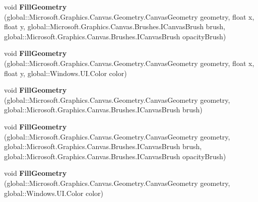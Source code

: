 \begin{DoxyCompactItemize}
\item 
\mbox{\label{class_microsoft_1_1_graphics_1_1_canvas_1_1_canvas_drawing_session_abc70f39b3a78c8e70caa372c554fce31}} 
void {\bfseries Fill\+Geometry} (global\+::\+Microsoft.\+Graphics.\+Canvas.\+Geometry.\+Canvas\+Geometry geometry, float x, float y, global\+::\+Microsoft.\+Graphics.\+Canvas.\+Brushes.\+I\+Canvas\+Brush brush, global\+::\+Microsoft.\+Graphics.\+Canvas.\+Brushes.\+I\+Canvas\+Brush opacity\+Brush)
\item 
\mbox{\label{class_microsoft_1_1_graphics_1_1_canvas_1_1_canvas_drawing_session_a91e2f4442ed0c330f3dd797c3fd4cf52}} 
void {\bfseries Fill\+Geometry} (global\+::\+Microsoft.\+Graphics.\+Canvas.\+Geometry.\+Canvas\+Geometry geometry, float x, float y, global\+::\+Windows.\+U\+I.\+Color color)
\item 
\mbox{\label{class_microsoft_1_1_graphics_1_1_canvas_1_1_canvas_drawing_session_a2974139306e2c32e4199065c8186fe79}} 
void {\bfseries Fill\+Geometry} (global\+::\+Microsoft.\+Graphics.\+Canvas.\+Geometry.\+Canvas\+Geometry geometry, global\+::\+Microsoft.\+Graphics.\+Canvas.\+Brushes.\+I\+Canvas\+Brush brush)
\item 
\mbox{\label{class_microsoft_1_1_graphics_1_1_canvas_1_1_canvas_drawing_session_a7541b81c9df77b3a48d7da7c544c5eae}} 
void {\bfseries Fill\+Geometry} (global\+::\+Microsoft.\+Graphics.\+Canvas.\+Geometry.\+Canvas\+Geometry geometry, global\+::\+Microsoft.\+Graphics.\+Canvas.\+Brushes.\+I\+Canvas\+Brush brush, global\+::\+Microsoft.\+Graphics.\+Canvas.\+Brushes.\+I\+Canvas\+Brush opacity\+Brush)
\item 
\mbox{\label{class_microsoft_1_1_graphics_1_1_canvas_1_1_canvas_drawing_session_aa4597681767e7ab7be35a7aa024588d0}} 
void {\bfseries Fill\+Geometry} (global\+::\+Microsoft.\+Graphics.\+Canvas.\+Geometry.\+Canvas\+Geometry geometry, global\+::\+Windows.\+U\+I.\+Color color)
\item 
\mbox{\label{class_microsoft_1_1_graphics_1_1_canvas_1_1_canvas_drawing_session_a67a01983413bc50a974695a718055382}} 

\end{DoxyCompactItemize}

